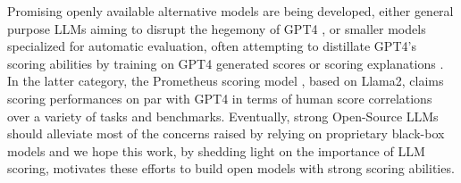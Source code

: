 Promising openly available alternative models are being developed, either general purpose LLMs aiming to disrupt the hegemony of GPT4 \cite{touvron_llama_2023, bai2023qwen}, or smaller models specialized for automatic evaluation, often attempting to distillate GPT4's scoring abilities by training on GPT4 generated scores or scoring explanations . In the latter category, the Prometheus scoring model , based on Llama2, claims scoring performances on par with GPT4 in terms of human score correlations over a variety of tasks and benchmarks. Eventually, strong Open-Source LLMs should alleviate most of the concerns raised by relying on proprietary black-box models and we hope this work, by shedding light on the importance of LLM scoring, motivates these efforts to build open models with strong scoring abilities. 


% 




